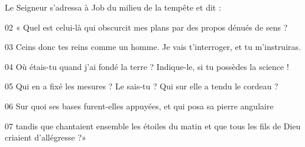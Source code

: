 Le Seigneur s’adressa à Job du milieu de la tempête et dit :

02 « Quel est celui-là qui obscurcit mes plans par des propos dénués de sens ?

03 Ceins donc tes reins comme un homme. Je vais t’interroger, et tu m’instruiras.

04 Où étais-tu quand j’ai fondé la terre ? Indique-le, si tu possèdes la science !

05 Qui en a fixé les mesures ? Le sais-tu ? Qui sur elle a tendu le cordeau ?

06 Sur quoi ses bases furent-elles appuyées, et qui posa sa pierre angulaire

07 tandis que chantaient ensemble les étoiles du matin et que tous les fils de Dieu criaient d’allégresse ?»
